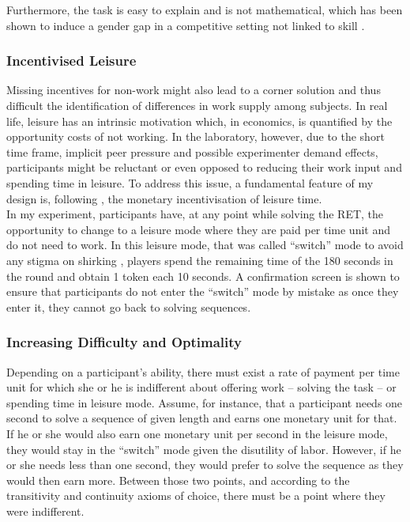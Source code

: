     Furthermore, the task is easy to explain and is not mathematical, which has been shown to induce a gender gap in a competitive setting not linked to skill \citep{niederle2010}.\\ 
    
    \subsubsection{Incentivised Leisure}
    \label{ss:switch_mode}
    
    Missing incentives for non-work might also lead to a corner solution and thus difficult the identification of differences in work supply among subjects. In real life, leisure has an intrinsic motivation which, in economics, is quantified by the opportunity costs of not working. In the laboratory, however, due to the short time frame, implicit peer pressure and possible experimenter demand effects, participants might be reluctant or even opposed to reducing their work input and spending time in leisure. To address this issue, a fundamental feature of my design is, following \citeauthor{sausgruberForthcoming}, the monetary incentivisation of leisure time.\\
    
    In my experiment, participants have, at any point while solving the RET, the opportunity to change to a leisure mode where they are paid per time unit and do not need to work. In this leisure mode, that was called ``switch'' mode to avoid any stigma on shirking \citep{rey-biel2016, eriksson2009}, players spend the remaining time of the 180 seconds in the round and obtain 1 token each 10 seconds. A confirmation screen is shown to ensure that participants do not enter the ``switch'' mode by mistake as once they enter it, they cannot go back to solving sequences.
    
    \subsubsection{Increasing Difficulty and Optimality}
    
    Depending on a participant's ability, there must exist a rate of payment per time unit for which she or he is indifferent about offering work -- solving the task -- or spending time in leisure mode. Assume, for instance, that a participant needs one second to solve a sequence of given length and earns one monetary unit for that. If he or she would also earn one monetary unit per second in the leisure mode, they would stay in the ``switch'' mode given the disutility of labor. However, if he or she needs less than one second, they would prefer to solve the sequence as they would then earn more. Between those two points, and according to the transitivity and continuity axioms of choice, there must be a point where they were indifferent.\\
    
